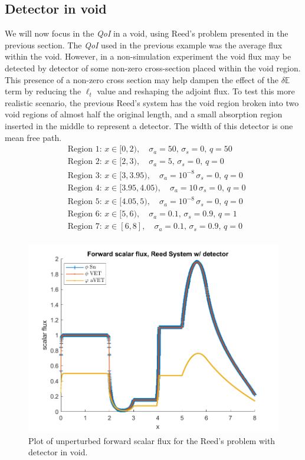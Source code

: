 \documentclass[12pt]{report}
\newcommand{\Edd}{\mathbb{E}}
\newcommand{\sigs}{\sigma_s}
\newcommand{\siga}{\sigma_a}
\newcommand{\isigt}{\ell_t}
\newcommand{\qoi}{{\it QoI}\xspace}
\begin{document}
\subsection{Detector in void}
We will now focus in the \qoi in a void, using Reed's problem presented in the previous section. The \qoi used in the previous example was the average flux within the void. However, in a non-simulation experiment the void flux may be detected by detector of some non-zero cross-section placed within the void region. This presence of a non-zero cross section may help dampen the effect of the $\delta \Edd$ term by reducing the $\isigt$ value and reshaping the adjoint flux. To test this more realistic scenario, the previous Reed's system has the void region broken into two void regions of almost half the original length, and a small absorption region inserted in the middle to represent a detector. The width of this detector is one mean free path.
\begin{equation*}
\begin{split}
&\text{Region 1: } x \in [0,2), \quad \siga=50, \, 			\sigs=0, \, q=50 \\
&\text{Region 2: } x \in [2,3), \quad \siga=5, \, 			\sigs=0, \, q=0 \\
&\text{Region 3: } x \in [3,3.95), \quad \siga=10^{-8} \,	\sigs=0, \, q=0 \\
&\text{Region 4: } x \in [3.95,4.05), \quad \siga=10 \,	\sigs=0, \, q=0 \\
&\text{Region 5: } x \in [4.05,5), \quad \siga=10^{-8} \,	\sigs=0, \, q=0 \\
&\text{Region 6: } x \in [5,6), \quad \siga=0.1, \, 		\sigs=0.9, \, q=1 \\
&\text{Region 7: } x \in [6,8], \quad \siga=0.1, \, 		\sigs=0.9, \, q=0\\
\end{split}
\end{equation*}
\begin{figure}[H]
\centering
 \includegraphics[scale=0.75]{figures2/775phi.png}
 \caption{Plot of unperturbed forward scalar flux for the Reed's problem with detector in void.}
\label{fig:Flux6}
\end{figure}
 
\end{document}
